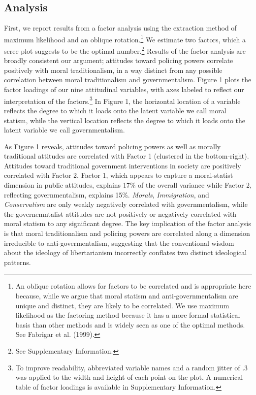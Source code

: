 \documentclass[12pt,]{article}
\begin{document}
\subsection{Analysis}\label{analysis}

First, we report results from a factor analysis using the extraction
method of maximum likelihood and an oblique rotation.\footnote{An
  oblique rotation allows for factors to be correlated and is
  appropriate here because, while we argue that moral statism and
  anti-governmentalism are unique and distinct, they are likely to be
  correlated. We use maximum likelihood as the factoring method because
  it has a more formal statistical basis than other methods and is
  widely seen as one of the optimal methods. See Fabrigar et al. (1999).} We estimate two factors, which a scree plot suggests to be the
optimal number.\footnote{See Supplementary Information.} Results of the
factor analysis are broadly consistent our argument; attitudes toward
policing powers correlate positively with moral traditionalism, in a way
distinct from any possible correlation between moral traditionalism and
governmentalism. Figure 1 plots the factor loadings of our nine
attitudinal variables, with axes labeled to reflect our interpretation
of the
factors.\footnote{To improve readability, abbreviated variable names and a random jitter of .3 was applied to the width and height of each point on the plot. A numerical table of factor loadings is available in Supplementary Information.}
In Figure 1, the horizontal location of a variable reflects the degree
to which it loads onto the latent variable we call moral statism, while
the vertical location reflects the degree to which it loads onto the
latent variable we call governmentalism.

As Figure 1 reveals, attitudes toward policing powers as well as morally
traditional attitudes are correlated with Factor 1 (clustered in the
bottom-right). Attitudes toward traditional government interventions in
society are positively correlated with Factor 2. Factor 1, which appears
to capture a moral-statist dimension in public attitudes, explains 17\%
of the overall variance while Factor 2, reflecting governmentalism,
explains 15\%. \emph{Morals}, \emph{Immigration}, and
\emph{Conservatism} are only weakly negatively correlated with
governmentalism, while the governemntalist attitudes are not positively
or negatively correlated with moral statism to any significant degree.
The key implication of the factor analysis is that moral traditionalism
and policing powers are correlated along a dimension irreducible to
anti-govermentalism, suggesting that the conventional wisdom about the
ideology of libertarianism incorrectly conflates two distinct
ideological patterns.
\end{document}
